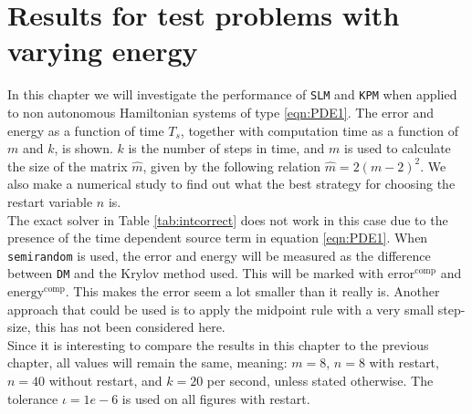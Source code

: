 \chapter{Results for test problems with varying energy}%
\label{sec:varyener} %
In this chapter we will investigate the performance of \texttt{SLM} and \texttt{KPM} when applied to non autonomous Hamiltonian systems of type \eqref{eqn:PDE1}. The error and energy as a function of time $T_s$, together with computation time as a function of $m$ and $k$, is shown. $k$ is the number of steps in time, and $m$ is used to calculate the size of the matrix $\hat{m}$, given by the following relation $\hat{m} = 2(m-2)^2$. We also make a numerical study to find out what the best strategy for choosing the restart variable $n$ is.\\%

\noindent The exact solver in Table \ref{tab:intcorrect} does not work in this case due to the presence of the time dependent source term in equation \eqref{eqn:PDE1}. When \texttt{semirandom} is used, the error and energy will be measured as the difference between \texttt{DM} and the Krylov method used. This will be marked with $\text{error}^{\text{comp}}$ and $\text{energy}^{\text{comp}}$. This makes the error seem a lot smaller than it really is. 
Another approach that could be used is to apply the midpoint rule with a very small step-size, this has not been considered here.  \\

\noindent Since it is interesting to compare the results in this chapter to the previous chapter, all values will remain the same, meaning: $m = 8$, $n = 8$ with restart, $n = 40$ without restart, and $k = 20$ per second, unless stated otherwise. The tolerance $\iota = 1e-6$ is used on all figures with restart. 

